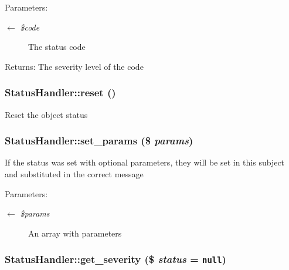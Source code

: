\begin{Desc}
\item[Parameters:]
\begin{description}
\item[\mbox{$\leftarrow$} {\em \$code}]The status code \end{description}
\end{Desc}
\begin{Desc}
\item[Returns:]The severity level of the code \end{Desc}
\hypertarget{classStatusHandler_8b0a327d3272ae49032a596518d47164}{
\subsubsection{\setlength{\rightskip}{0pt plus 5cm}StatusHandler::reset ()}}
\label{classStatusHandler_8b0a327d3272ae49032a596518d47164}


Reset the object status \hypertarget{classStatusHandler_c35544d3ad8a435f69db0965ed674428}{
\subsubsection{\setlength{\rightskip}{0pt plus 5cm}StatusHandler::set\_\-params (\$ {\em params})}}
\label{classStatusHandler_c35544d3ad8a435f69db0965ed674428}


If the status was set with optional parameters, they will be set in this subject and substituted in the correct message

\begin{Desc}
\item[Parameters:]
\begin{description}
\item[\mbox{$\leftarrow$} {\em \$params}]An array with parameters \end{description}
\end{Desc}
\hypertarget{classStatusHandler_cadd0806c17eb02abcc92882e8588d4e}{
\subsubsection{\setlength{\rightskip}{0pt plus 5cm}StatusHandler::get\_\-severity (\$ {\em status} = {\tt null})}}
\label{classStatusHandler_cadd0806c17eb02abcc92882e8588d4e}


